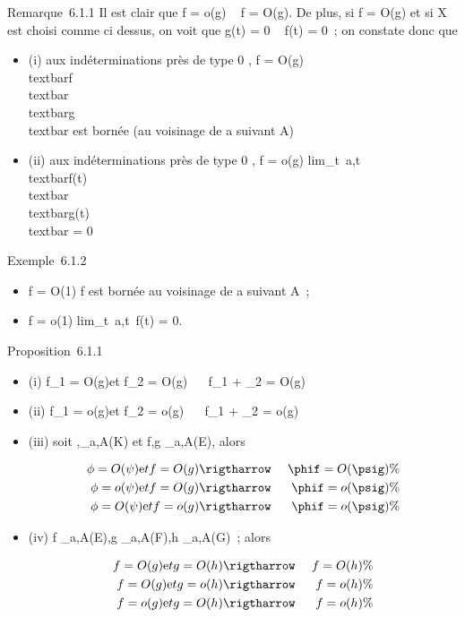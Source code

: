 \documentclass[]{article}
\begin{document}
Remarque~6.1.1 Il est clair que f = o(g) \rigtharrow~ f = O(g). De plus, si f =
O(g) et si X est choisi comme ci dessus, on voit que g(t) = 0 \rigtharrow~ f(t) =
0~; on constate donc que

\begin{itemize}
\itemsep1pt\parskip0pt
\item
  (i) aux indéterminations près de type  0  ,
  f = O(g) \Leftrightarrow
  \\textbar{}f\\textbar{}
  \over
  \\textbar{}g\\textbar{} est bornée (au
  voisinage de a suivant A)
\item
  (ii) aux indéterminations près de type  0  ,
  f = o(g) \Leftrightarrow
  lim\_t\rightarrow~a,t\inA~
  \\textbar{}f(t)\\textbar{}
  \over
  \\textbar{}g(t)\\textbar{} = 0
\end{itemize}

Exemple~6.1.2

\begin{itemize}
\itemsep1pt\parskip0pt
\item
  f = O(1) \Leftrightarrow f est bornée au voisinage de a
  suivant A~;
\item
  f = o(1) \Leftrightarrow
  lim\_t\rightarrow~a,t\inA~f(t) = 0.
\end{itemize}

Proposition~6.1.1

\begin{itemize}
\item
  (i) f\_1 = O(g)\text et f\_2 = O(g)
  \rigtharrow~ \alpha~f\_1 + \muf\_2 = O(g)
\item
  (ii) f\_1 = o(g)\text et f\_2 =
  o(g) \rigtharrow~ \alpha~f\_1 + \muf\_2 = o(g)
\item
  (iii) soit \phi,\psi {}\_a,A(K) et f,g \_a,A(E), alors

  \begin{align*} \phi = O(\psi)\text et
  f = O(g)& \rigtharrow~& \phif = O(\psig)\%& \\ \phi =
  o(\psi)\text et f = O(g)& \rigtharrow~& \phif = o(\psig) \%&
  \\ \phi = O(\psi)\text et f
  = o(g)& \rigtharrow~& \phif = o(\psig) \%& \\
  \end{align*}
\item
  (iv) f \_a,A(E),g \_a,A(F),h \_a,A(G)~;
  alors

  \begin{align*} f = O(g)\text et
  g = O(h)& \rigtharrow~& f = O(h)\%& \\ f =
  O(g)\text et g = o(h)& \rigtharrow~& f = o(h) \%&
  \\ f = o(g)\text et g
  = O(h)& \rigtharrow~& f = o(h) \%& \\
  \end{align*}
\end{itemize}
\end{document}
